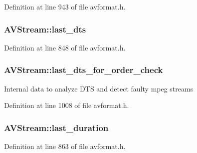 Definition at line 943 of file avformat.\+h.

\subsubsection[{\texorpdfstring{last\+\_\+dts}{last_dts}}]{ A\+V\+Stream\+::last\+\_\+dts}\hypertarget{struct_a_v_stream_a1c89d3d6eedba5bab6e3e12f0d6fb70e}{}\label{struct_a_v_stream_a1c89d3d6eedba5bab6e3e12f0d6fb70e}


Definition at line 848 of file avformat.\+h.

\subsubsection[{\texorpdfstring{last\+\_\+dts\+\_\+for\+\_\+order\+\_\+check}{last_dts_for_order_check}}]{ A\+V\+Stream\+::last\+\_\+dts\+\_\+for\+\_\+order\+\_\+check}\hypertarget{struct_a_v_stream_ada8c3bd5c2de4c1b5f0895e088167e03}{}\label{struct_a_v_stream_ada8c3bd5c2de4c1b5f0895e088167e03}
Internal data to analyze D\+TS and detect faulty mpeg streams 

Definition at line 1008 of file avformat.\+h.

\subsubsection[{\texorpdfstring{last\+\_\+duration}{last_duration}}]{ A\+V\+Stream\+::last\+\_\+duration}\hypertarget{struct_a_v_stream_af2a160604ac831709bc4f011a3a38410}{}\label{struct_a_v_stream_af2a160604ac831709bc4f011a3a38410}


Definition at line 863 of file avformat.\+h.

